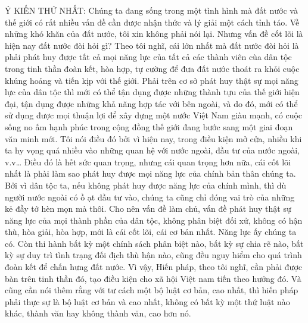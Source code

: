 Ý KIẾN THỨ NHẤT: Chúng ta đang sống trong một tình hình mà đất nước và thế giới có rất nhiều vấn đề cần được nhận thức và lý giải một cách tỉnh táo. Về những khó khăn của đất nước, tôi xin không phải nói lại. Nhưng vấn đề cốt lõi là hiện nay đất nước đòi hỏi gì? Theo tôi nghĩ, cái lớn nhất mà đất nước đòi hỏi là phải phát huy được tất cả mọi năng lực của tất cả các thành viên cùa dân tộc trong tinh thần đoàn kết, hòa hợp, tự cường để đưa đất nước thoát ra khỏi cuộc khủng hoảng và tiến kịp với thế giới. Phải trên cơ sở phát huy thật sự mọi năng lực của dân tộc thì mới có thể tận dụng được những thành tựu của thế giới hiện đại, tận dụng được những khả năng hợp tác với bên ngoài, và do đó, mới có thể sử dụng được mọi thuận lợi để xây dựng một nước Việt Nam giàu mạnh, có cuộc sống no ấm hạnh phúc trong cộng đồng thế giới đang bước sang một giai đoạn văn minh mới. Tôi nói điều đó bởi vì hiện nay, trong điều kiện mở cửa, nhiều khi ta hy vọng quá nhiều vào những quan hệ với nước ngoài, đầu tư của nước ngoài, v.v… Điều đó là hết sức quan trọng, nhưng cái quan trọng hơn nữa, cái cốt lõi nhất là phài làm sao phát huy được mọi năng lực của chính bản thân chúng ta. Bởi vì dân tộc ta, nếu không phát huy được năng lực của chính mình, thì dù người nước ngoài có ồ ạt đầu tư vào, chúng ta cũng chỉ đóng vai trò của những kẻ đầy tớ hèn mọn mà thôi. Cho nên vấn đề làm chủ, vấn đề phát huy thật sự năng lực của mọi thành phần của dân tộc, không phân biệt đối xử, không có hận thù, hòa giải, hòa hợp, mới là cái cốt lõi, cái cơ bản nhất. Năng lực ấy chúng ta có. Còn thi hành bất kỳ một chính sách phân biệt nào, bất kỳ sự chia rẽ nào, bất kỳ sự duy trì tình trạng đối địch thù hận nào, cũng đều nguy hiểm cho quá trình đoàn kết để chấn hưng đất nước. Vì vậy, Hiến pháp, theo tôi nghĩ, cần phải được bàn trên tinh thần đó, tạo điều kiện cho xã hội Việt nam tiến theo hướng đó. Và cũng cần nói thêm rằng với tư cách một bộ luật cơ bản, cao nhất, thì hiến pháp phải thực sự là bộ luật cơ bản và cao nhất, không có bất kỳ một thứ luật nào khác, thành văn hay không thành văn, cao hơn nó.

